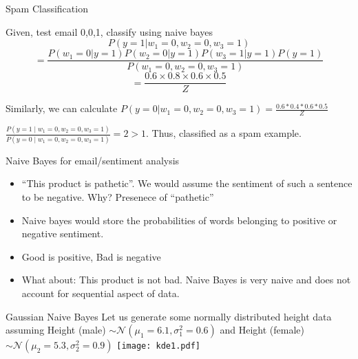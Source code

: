 \documentclass{beamer}
\begin{document}
\begin{frame}{Spam Classification}
    
    Given, test email {0,0,1}, classify using naive bayes
    \pause 
$$
        P(y=1\vert w_{1}=0,w_{2} = 0,w_{3}=1) 
$$
$$ = \frac{P(w_{1}=0|y=1) P(w_{2}=0|y=1) P(w_{3}=1|y=1) P(y=1)}{P(w_{1}=0, w_{2}=0, w_{3}=1)}
    $$
    $$ = \frac{0.6\times 0.8 \times 0.6 \times 0.5}{Z}
    $$
    
\pause Similarly, we can calculate $P(y=0\vert w_{1}=0,w_{2} = 0,w_{3}=1) = \frac{0.6*0.4*0.6*0.5}{Z} $

\pause $\frac{P\left(y=1 \mid w_{1}=0, w_{2}=0, w_{3}=1\right)}{P\left(y=0 \mid w_{1}=0, w_{2}=0, w_{3}=1\right)} = 2 > 1$. Thus, classified as a spam example.
    
\end{frame}

\begin{frame}{Naive Bayes for email/sentiment analysis}
    \begin{itemize}
        \item ``This product is pathetic''. We would assume the sentiment of such a sentence to be negative. Why? Presenece of ``pathetic''
        \item Naive bayes would store the probabilities of words belonging to positive or negative sentiment.
        \item Good is positive, Bad is negative
        \item What about: This product is not bad. Naive Bayes is very naive and does not account for sequential aspect of data.
    \end{itemize}
    
\end{frame}

%    
%    


\begin{frame}{Gaussian Naive Bayes}
    Let us generate some normally distributed height data assuming Height (male) $\sim \mathcal{N}(\mu_1 = 6.1, \sigma_1^2 = 0.6)$
 and Height (female) $\sim \mathcal{N}(\mu_2 = 5.3, \sigma_2^2 = 0.9)$
    \texttt{[image: kde1.pdf]}
\end{frame}
\end{document}
